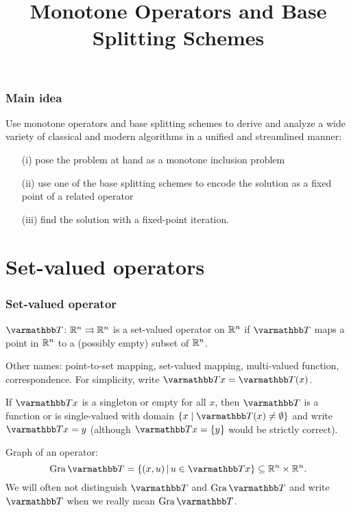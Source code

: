 \documentclass[10pt,mathserif]{beamer}
\title{\large \bfseries Monotone Operators and Base Splitting Schemes}
\begin{document}
\frame{
\thispagestyle{empty}
\titlepage
}


\begin{frame}
\frametitle{Main idea}
Use monotone operators and base splitting schemes to derive and analyze a wide variety of classical and modern algorithms in a unified and streamlined manner:
\begin{itemize}
\item [(i)] pose the problem at hand as a monotone inclusion problem
\item [(ii)] use one of the base splitting schemes to encode the solution as a fixed point of a related operator
\item[(iii)] find the solution with a fixed-point iteration.
\end{itemize}


\end{frame}






\section{Set-valued operators}
\begin{frame}
\frametitle{Set-valued operator}
 $\opT\colon\reals^n\rightrightarrows \reals^n$ is a set-valued operator
 on $\mathbb{R}^n$ if $\opT$ maps a point in $\mathbb{R}^n$ to a (possibly empty) subset of $\mathbb{R}^n$.

\vspace{0.2in}
Other names: point-to-set mapping, set-valued mapping, multi-valued function, correspondence.
For  simplicity, write $\opT x=\opT(x)$.


\vspace{0.2in}
If $\opT x$ is a singleton or empty for all $x$, then $\opT$ is a function or is single-valued with domain $\{x\;|\;\opT(x)\ne \emptyset\}$ and write  $\opT x  = y$
(although $\opT x  = \{y\}$ would be strictly correct).


\vspace{0.2in}

Graph of an operator:
\[
\gra \opT = \{
(x,u)\,|\,u\in \opT x
\}
\subseteq \reals^n\times \reals^n.
\]
We will often not distinguish $\opT$ and $\gra \opT$ and write $\opT$ when we really mean $\gra \opT$.
\end{frame}
\end{document}
